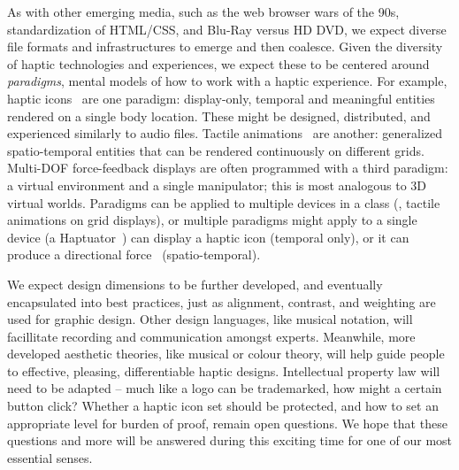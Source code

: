 As with other emerging media, such as the web browser wars of the 90s, standardization of HTML/CSS, and Blu-Ray versus HD DVD, we expect diverse file formats and infrastructures to emerge and then coalesce.
Given the diversity of haptic technologies and experiences, we expect these to be centered around \emph{paradigms}, mental models of how to work with a haptic experience.
For example, haptic icons~\citep{MacLean2003} are one paradigm: display-only, temporal and meaningful entities rendered on a single body location. These might be designed, distributed, and experienced similarly to audio files.
Tactile animations~\citep{Schneider2015} are another: generalized spatio-temporal entities that can be rendered continuously on different grids.
Multi-DOF force-feedback displays are often programmed with a third paradigm: a virtual environment and a single manipulator; this is most analogous to 3D virtual worlds.
Paradigms can be applied to multiple devices in a class (\eg, tactile animations on grid displays), or multiple paradigms might apply to a single device (a Haptuator~\citep{Yao2010}) can display a haptic icon (temporal only), or it can produce a directional force~\citep{Culbertson2016} (spatio-temporal).

We expect design dimensions to be further developed, and eventually encapsulated into best practices, just as alignment, contrast, and weighting are used for graphic design.
Other design languages, like musical notation, will facillitate recording and communication amongst experts.
Meanwhile, more developed aesthetic theories, like musical  or colour theory, will help guide people to effective, pleasing, differentiable haptic designs.
Intellectual property law will need to be adapted -- much like a logo can be trademarked, how might a certain button click? 
Whether a haptic icon set should be protected, and how to set an appropriate level for burden of proof, remain open questions.
We hope that these questions and more will be answered during this exciting time for one of our most essential senses.




